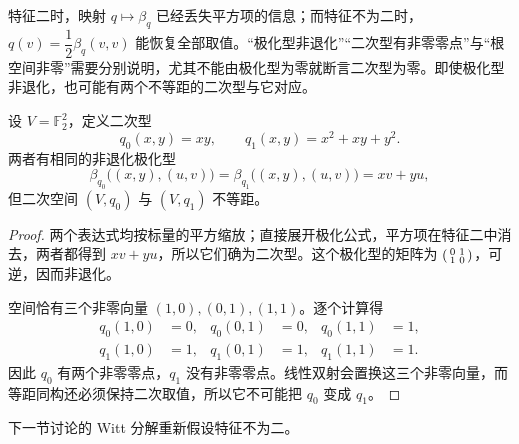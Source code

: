 \ProseParagraphBreak
特征二时，映射 \(q\mapsto\beta_q\) 已经丢失平方项的信息；而特征不为二时，\(q(v)=\dfrac12\beta_q(v,v)\) 能恢复全部取值。“极化型非退化”“二次型有非零零点”与“根空间非零”需要分别说明，尤其不能由极化型为零就断言二次型为零。即使极化型非退化，也可能有两个不等距的二次型与它对应。

\begin{proposition}\label{b2:prop:quadratic-char-two-polar-failure}
	设 \(V=\mathbb F_2^2\)，定义二次型
	\[
		q_0(x,y)=xy,\qquad q_1(x,y)=x^2+xy+y^2.
	\]
	两者有相同的非退化极化型
	\[
		\beta_{q_0}\bigl((x,y),(u,v)\bigr) =\beta_{q_1}\bigl((x,y),(u,v)\bigr)=xv+yu,
	\]
	但二次空间 \((V,q_0)\) 与 \((V,q_1)\) 不等距。
\end{proposition}
\begin{proof}
	两个表达式均按标量的平方缩放；直接展开极化公式，平方项在特征二中消去，两者都得到 \(xv+yu\)，所以它们确为二次型。这个极化型的矩阵为 \(\begin{psmallmatrix}0&1\\1&0\end{psmallmatrix}\)，可逆，因而非退化。

	空间恰有三个非零向量 \((1,0),(0,1),(1,1)\)。逐个计算得
	\[
		\begin{aligned}
			q_0(1,0)&=0,&q_0(0,1)&=0,&q_0(1,1)&=1,\\
			q_1(1,0)&=1,&q_1(0,1)&=1,&q_1(1,1)&=1.
		\end{aligned}
	\]
	因此 \(q_0\) 有两个非零零点，\(q_1\) 没有非零零点。线性双射会置换这三个非零向量，而等距同构还必须保持二次取值，所以它不可能把 \(q_0\) 变成 \(q_1\)。
\end{proof}

下一节讨论的 Witt 分解重新假设特征不为二。

